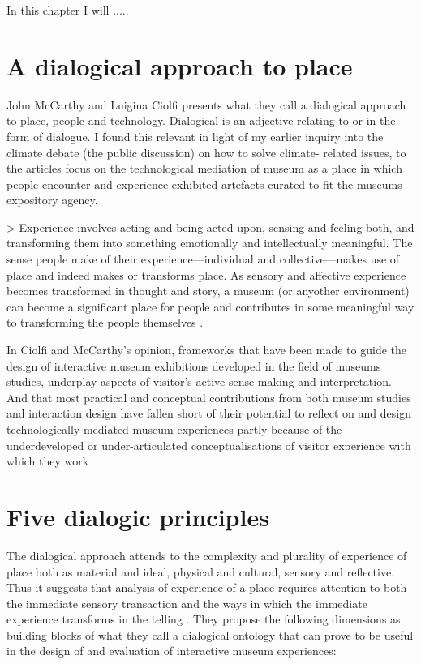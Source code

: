 In this chapter I will .....

\section{A dialogical approach to place}
John McCarthy and Luigina Ciolfi presents what they call a dialogical approach to place, people and technology. Dialogical is an adjective relating to or in the form of dialogue. I found this relevant in light of my earlier inquiry into the climate debate (the public discussion) on how to solve climate- related issues, to the articles focus on the technological mediation of museum as a place in which people encounter and experience exhibited artefacts curated to fit the museums expository agency.

> Experience involves acting and being acted upon, sensing and feeling both, and transforming them into something emotionally and intellectually meaningful. The sense people make of their experience—individual and collective—makes use of place and indeed makes or transforms place. As sensory and affective experience becomes transformed in thought and story, a museum (or anyother environment) can become a significant place for people and contributes in some meaningful way to transforming the people themselves \autocite[p. 250]{mccarthy_place}.

In Ciolfi and McCarthy’s opinion, frameworks that have been made to guide the design of interactive museum exhibitions developed in the field of museums studies, underplay aspects of visitor’s active sense making and interpretation. And that most practical and conceptual contributions from both museum studies and interaction design have fallen short of their potential to reflect on and design technologically mediated museum experiences partly because of the underdeveloped or under-articulated conceptualisations of visitor experience with which they work \autocite[p. 248]{mccarthy_place}


\section{Five dialogic principles}
The dialogical approach attends to the complexity and plurality of experience of place both as material and ideal, physical and cultural, sensory and reflective. Thus it suggests that analysis of experience of a place requires attention to both the immediate sensory transaction and the ways in which the immediate experience transforms in the telling \autocite[p. 251]{mccarthy_place}. They propose the following dimensions as building blocks of what they call a dialogical ontology that can prove to be useful in the design of and evaluation of interactive museum experiences:

